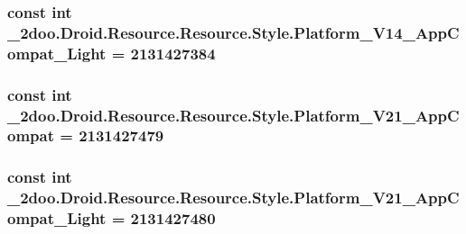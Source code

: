 \hypertarget{class__2doo_1_1_droid_1_1_resource_1_1_style_58c31f6644636a0dd7be3a85efd7dd03}{
\subsubsection[{Platform\_\-V14\_\-AppCompat\_\-Light}]{\setlength{\rightskip}{0pt plus 5cm}const int \_\-2doo.Droid.Resource.Resource.Style.Platform\_\-V14\_\-AppCompat\_\-Light = 2131427384}}
\label{class__2doo_1_1_droid_1_1_resource_1_1_style_58c31f6644636a0dd7be3a85efd7dd03}


\hypertarget{class__2doo_1_1_droid_1_1_resource_1_1_style_82024f237bf460cb0ab1a95f9b391b95}{
\subsubsection[{Platform\_\-V21\_\-AppCompat}]{\setlength{\rightskip}{0pt plus 5cm}const int \_\-2doo.Droid.Resource.Resource.Style.Platform\_\-V21\_\-AppCompat = 2131427479}}
\label{class__2doo_1_1_droid_1_1_resource_1_1_style_82024f237bf460cb0ab1a95f9b391b95}


\hypertarget{class__2doo_1_1_droid_1_1_resource_1_1_style_6134b543a199d45e558cff0f004bbc2e}{
\subsubsection[{Platform\_\-V21\_\-AppCompat\_\-Light}]{\setlength{\rightskip}{0pt plus 5cm}const int \_\-2doo.Droid.Resource.Resource.Style.Platform\_\-V21\_\-AppCompat\_\-Light = 2131427480}}
\label{class__2doo_1_1_droid_1_1_resource_1_1_style_6134b543a199d45e558cff0f004bbc2e}


